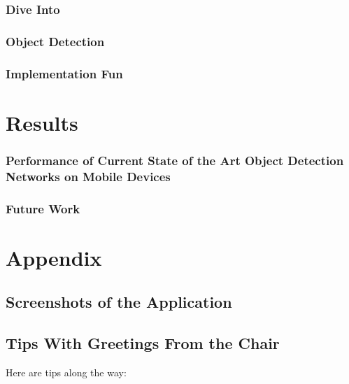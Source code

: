 \documentclass[11pt,
               a4paper,
               bibtotoc,
               idxtotoc,
               headsepline,
               footsepline,
               footexclude,
               BCOR12mm,
               DIV13,
               openany,   %
               ]
               {scrbook}
\begin{document}
\section{Dive Into}
\section{Object Detection}
\section{Implementation Fun}


\part{Results}

\section{Performance of Current State of the Art Object Detection Networks on Mobile Devices}

\section{Future Work} %


\appendix
\part{Appendix}

\chapter{Screenshots of the Application}

\chapter{Tips With Greetings From the Chair}
\label{sec:tips}       %
Here are tips along the way:
\end{document}
